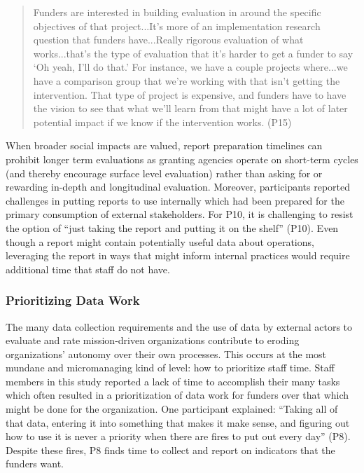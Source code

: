 \begin{quote}\singlespacing Funders are interested in building evaluation in around the specific objectives of that project...It’s more of an implementation research question that funders have...Really rigorous evaluation of what works...that’s the type of evaluation that it’s harder to get a funder to say ‘Oh yeah, I’ll do that.’ For instance, we have a couple projects where...we have a comparison group that we’re working with that isn’t getting the intervention. That type of project is expensive, and funders have to have the vision to see that what we’ll learn from that might have a lot of later potential impact if we know if the intervention works. (P15)\end{quote}

When broader social impacts are valued, report preparation timelines can prohibit longer term evaluations as granting agencies operate on short-term cycles (and thereby encourage surface level evaluation) rather than asking for or rewarding in-depth and longitudinal evaluation. Moreover, participants reported challenges in putting reports to use internally which had been prepared for the primary consumption of external stakeholders. For P10, it is challenging to resist the option of “just taking the report and putting it on the shelf” (P10). Even though a report might contain potentially useful data about operations, leveraging the report in ways that might inform internal practices would require additional time that staff do not have. 

\subsubsection{Prioritizing Data Work}
The many data collection requirements and the use of data by external actors to evaluate and rate mission-driven organizations contribute to eroding organizations’ autonomy over their own processes. This occurs at the most mundane and micromanaging kind of level: how to prioritize staff time. Staff members in this study reported a lack of time to accomplish their many tasks which often resulted in a prioritization of data work for funders over that which might be done for the organization. One participant explained: “Taking all of that data, entering it into something that makes it make sense, and figuring out how to use it is never a priority when there are fires to put out every day” (P8). Despite these fires, P8 finds time to collect and report on indicators that the funders want.


